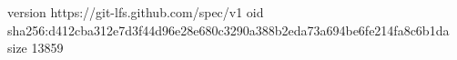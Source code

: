 version https://git-lfs.github.com/spec/v1
oid sha256:d412cba312e7d3f44d96e28e680c3290a388b2eda73a694be6fe214fa8c6b1da
size 13859
